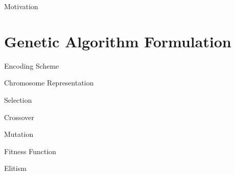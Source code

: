 \documentclass[aspectratio=169,xcolor=dvipsnames]{beamer}
\begin{document}
\begin{frame}{Motivation}
\end{frame}


\section{Genetic Algorithm Formulation}

\begin{frame}{Encoding Scheme}
    
\end{frame}

\begin{frame}{Chromosome Representation}
    
\end{frame}


\begin{frame}{Selection}
   
\end{frame}


\begin{frame}{Crossover}
   
\end{frame}


\begin{frame}{Mutation}
   
\end{frame}


\begin{frame}{Fitness Function}
   
\end{frame}

\begin{frame}{Elitism}
    
\end{frame}
\end{document}

